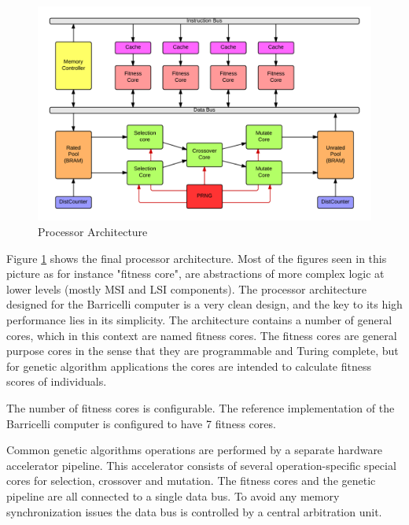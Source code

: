 \begin{figure}[H]
\includegraphics[width=\textwidth]{fpga/fig/processor_architecture.png}
\caption{Processor Architecture}
\label{figure:fpga-architecture}
\end{figure}


Figure \ref{figure:fpga-architecture} shows the final processor architecture. Most of the figures seen in this picture as for instance "fitness core", are abstractions of more complex logic at lower levels (mostly MSI and LSI components). 
The processor architecture designed for the Barricelli computer is a very clean design, and the key to its high performance lies in its simplicity.
The architecture contains a number of general cores, which in this context are named fitness cores.
The fitness cores are general purpose cores in the sense that they are programmable and Turing complete, but for genetic algorithm applications the cores are intended to calculate fitness scores of individuals.

The number of fitness cores is configurable.
The reference implementation of the Barricelli computer is configured to have 7 fitness cores.

Common genetic algorithms operations are performed by a separate hardware accelerator pipeline.
This accelerator consists of several operation-specific special cores for selection, crossover and mutation.
The fitness cores and the genetic pipeline are all connected to a single data bus.
To avoid any memory synchronization issues the data bus is controlled by a central arbitration unit.

